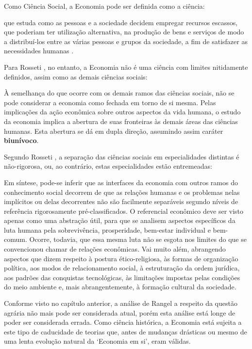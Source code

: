 \documentclass[
	12pt,				%
	oneside,			%
	a4paper,			%
	chapter=TITLE,		%
	section=TITLE,		%
	english,			%
	brazil				%
	]{abntex2}
\begin{document}
Como Ciência Social, a Economia pode ser definida como a ciência:
\begin{citacao}
que estuda como as pessoas e a sociedade decidem empregar recursos escassos, que
poderiam ter utilização alternativa, na produção de bens e serviços de modo a
distribuí-los  entre as várias pessoas e grupos da sociedade, a fim de
satisfazer as necessidades humanas
\cite[p.~5]{passosnogami}.
\end{citacao}
Para Rosseti \autocite*[31]{rossetti}, no entanto, a Economia não é uma ciência com
limites nitidamente definidos, assim como as demais ciências sociais:
\begin{citacao}
À semelhança do que ocorre com os demais ramos das ciências sociais, não se pode
considerar a economia como fechada em torno de si mesma. Pelas implicações da
ação econômica sobre outros aspectos da vida humana, o estudo da economia
implica a abertura de suas fronteiras às demais áreas das ciências humanas. Esta
abertura se dá em dupla direção, assumindo assim caráter \textbf{biunívoco}.
\end{citacao}
Segundo Rosseti \autocite*[32]{rossetti}, a separação das ciências sociais em
especialidades distintas é não-rigorosa, ou, ao contrário, estas especialidades
estão entremeadas:
\begin{citacao}
Em síntese, pode-se inferir que as interfaces da economia com outros ramos do
conhecimento social decorrem de que as relações humanas e os problemas nelas
implícitos ou delas decorrentes não são facilmente separáveis segundo níveis de
referência rigorosamente pré-classificados. O referencial econômico deve ser
visto apenas como uma abstração útil, para que se analisem aspectos específicos
da luta humana pela sobrevivência, prosperidade, bem-estar individual e
bem-comum. Ocorre, todavia, que essa mesma luta não se esgota nos limites do que
se convencionou chamar de relações econômicas. Vai muito além, abrangendo
aspectos que dizem respeito à postura ético-religiosa, às formas de organização
política, aos modos de relacionamento social, à estruturação da ordem jurídica,
aos padrões das conquistas tecnológicas, às limitações impostas pelas condições
do meio ambiente e, mais abrangentemente, à formação cultural da sociedade.
\end{citacao}
Conforme visto no capítulo anterior, a análise de Rangel a respeito da questão
agrária não mais pode ser considerada atual, porém esta análise está longe de
poder ser considerada errada. Como ciência histórica, a Economia está sujeita a
este tipo de caducidade de teorias que, antes de mudanças drásticas ou mesmo de
uma lenta evolução natural da `Economia em si', eram válidas.
\end{document}

